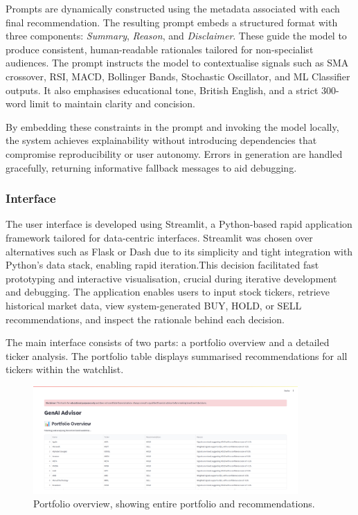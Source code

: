 Prompts are dynamically constructed using the metadata associated with each final recommendation. The resulting prompt embeds a structured format with three components: \textit{Summary}, \textit{Reason}, and \textit{Disclaimer}. These guide the model to produce consistent, human-readable rationales tailored for non-specialist audiences. The prompt instructs the model to contextualise signals such as SMA crossover, RSI, MACD, Bollinger Bands, Stochastic Oscillator, and ML Classifier outputs. It also emphasises educational tone, British English, and a strict 300-word limit to maintain clarity and concision.

By embedding these constraints in the prompt and invoking the model locally, the system achieves explainability without introducing dependencies that compromise reproducibility or user autonomy. Errors in generation are handled gracefully, returning informative fallback messages to aid debugging.

\subsubsection{Interface}

The user interface is developed using Streamlit, a Python-based rapid application framework tailored for data-centric interfaces. Streamlit was chosen over alternatives such as Flask or Dash due to its simplicity and tight integration with Python’s data stack, enabling rapid iteration.This decision facilitated fast prototyping and interactive visualisation, crucial during iterative development and debugging. The application enables users to input stock tickers, retrieve historical market data, view system-generated BUY, HOLD, or SELL recommendations, and inspect the rationale behind each decision.

The main interface consists of two parts: a portfolio overview and a detailed ticker analysis. The portfolio table displays summarised recommendations for all tickers within the watchlist. 

\begin{figure}[ht]
    \centering
    \includegraphics[width=0.9\textwidth]{assets/ui1-portfolio_overview.png}
    \caption{\small Portfolio overview, showing entire portfolio and recommendations.}
    \label{fig:ui-portfolio-overview}
\end{figure}

